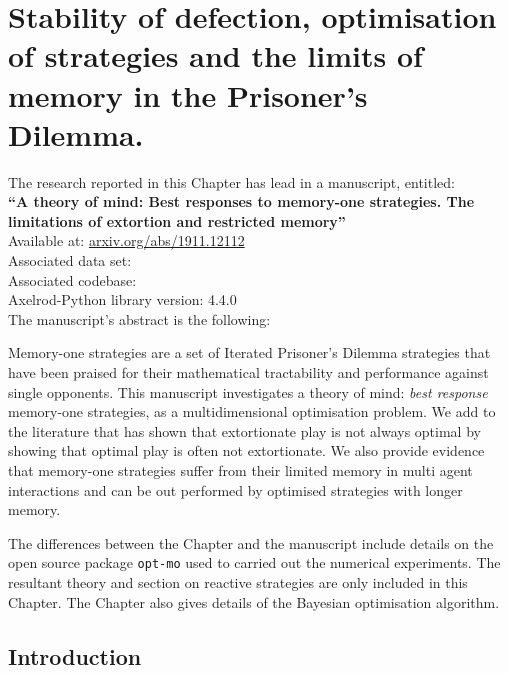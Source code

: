 
\chapter{Stability of defection, optimisation of strategies and the limits of
       memory in the Prisoner's Dilemma.}\label{chapter:memory_one}

\begin{center}
    The research reported in this Chapter has lead in a manuscript, entitled: \\
    \textbf{``A theory of mind: Best responses to memory-one strategies.
    The limitations of extortion and restricted memory''} \\
    Available at: \url{arxiv.org/abs/1911.12112} \\
    Associated data set: \cite{glynatsi2019} \\
    Associated codebase: \cite{Glynatsi2019_opt_mo} \\
    Axelrod-Python library version: 4.4.0 \\ \vspace{.5cm}
    The manuscript's abstract is the following:
\end{center}

Memory-one strategies are a set of Iterated Prisoner's Dilemma strategies that
have been praised for their mathematical tractability and performance against
single opponents. This manuscript investigates a theory of mind: \textit{best
response} memory-one strategies, as a multidimensional optimisation problem. We
add to the literature that has shown that extortionate play is not always
optimal by showing that optimal play is often not extortionate. We also provide
evidence that memory-one strategies suffer from their limited memory in multi
agent interactions and can be out performed by optimised strategies with longer
memory.

\hrulefill

The differences between the Chapter and the manuscript include details on the
open source package \texttt{opt-mo} used to carried out the
numerical experiments. The resultant theory and section on reactive strategies
are only included in this Chapter. The Chapter also gives details of the
Bayesian optimisation algorithm.

\section{Introduction}\label{section:mem_one_introduction}

